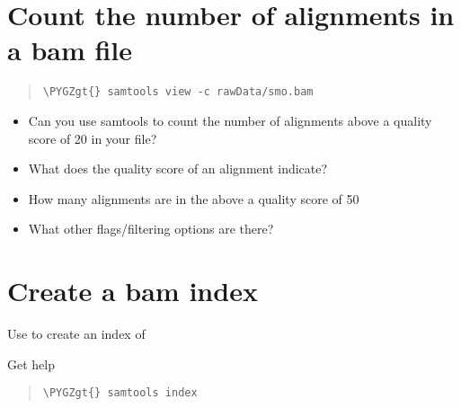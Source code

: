 \documentclass[a4paper,11pt,english]{sphinxmanual}
\def\PYGZgt{\char`\>}
\begin{document}
\section{Count the number of alignments in a bam file}
\label{exercises/STEP3_viewManipulateAlignmentData_samtools:count-the-number-of-alignments-in-a-bam-file}\begin{quote}

\begin{Verbatim}[frame=single, rulecolor=\color{lightgray}, fontfamily=courier, commandchars=\\\{\}]
\PYGZgt{} samtools view -c rawData/smo.bam
\end{Verbatim}
\end{quote}
\begin{itemize}
\item {} 
Can you use samtools to count the number of alignments above a quality score of 20 in your file?

\item {} 
What does the quality score of an alignment indicate?

\item {} 
How many alignments are in the  above a quality score of 50

\item {} 
What other flags/filtering options are there?

\end{itemize}


\section{Create a bam index}
\label{exercises/STEP3_viewManipulateAlignmentData_samtools:create-a-bam-index}
Use  to create an index of 

Get help
\begin{quote}

\begin{Verbatim}[frame=single, rulecolor=\color{lightgray}, fontfamily=courier, commandchars=\\\{\}]
\PYGZgt{} samtools index
\end{Verbatim}
\end{quote}
\end{document}
